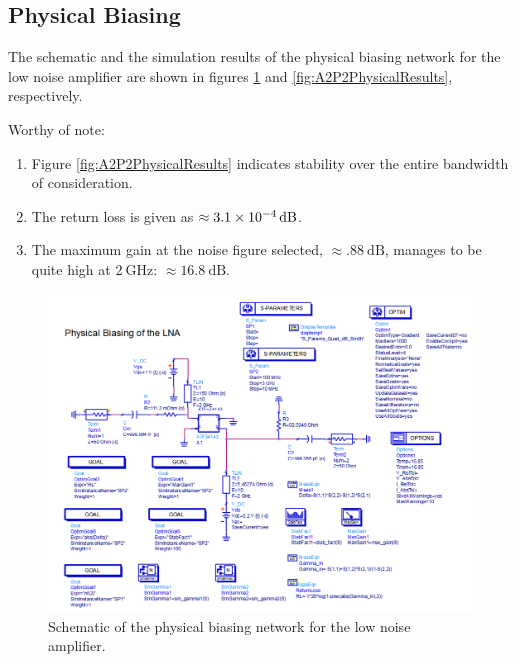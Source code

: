\subsection{Physical Biasing}

The schematic and the simulation results of the physical biasing network for the
low noise amplifier are shown in figures \ref{fig:A2P2PhysicalSchematic} and
\ref{fig:A2P2PhysicalResults}, respectively.

Worthy of note: 
\begin{enumerate}
    \item   Figure \ref{fig:A2P2PhysicalResults} indicates stability over the
        entire bandwidth of consideration.
    \item   The return loss is given as $\approx \SI{3.1E-4}{\deci\bel}$.
    \item   The maximum gain at the noise figure selected, $\approx
        \SI{.88}{\deci\bel}$, manages to be quite high at $\SI{2}{\giga\hertz}$:
        $\approx \SI{16.8}{\deci\bel}$.
\end{enumerate}

\begin{figure}[H]
    \centering
    \includegraphics[width=0.8\linewidth]{Images/A2P2PhysicalSchematic.png}
    \caption{Schematic of the physical biasing network for the low noise
    amplifier.}
    \label{fig:A2P2PhysicalSchematic}
\end{figure}

